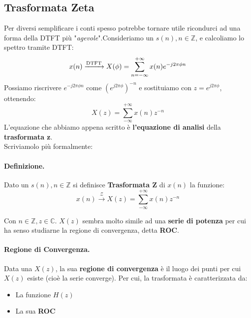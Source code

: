 \newcommand{\zTransform}{\xrightarrow{\mathscr{Z}}}
\newcommand{\zAntitransform}{\xrightarrow{\mathscr{Z}^{-1}}}
\subsection{Trasformata Zeta}
Per diversi semplificare i conti spesso potrebbe tornare utile ricondurci ad una forma della DTFT più "\textit{agevole}".Consideriamo
un $s(n), n\in \mathbb{Z}$, e calcoliamo lo spettro tramite DTFT:
\begin{equation*}
    x(n) \xrightarrow{\text{DTFT}} X(\phi) = \sum_{n = -\infty}^{+\infty} x(n)e^{-j2\pi \phi n}
\end{equation*}
Possiamo riscrivere $e^{-j2\pi \phi n}$ come $(e^{j2\pi \phi})^{-n}$ e sostituiamo con $z = e^{j2\pi \phi}$, ottenendo:
\begin{equation}
    X(z) = \sum_{-\infty}^{+\infty} x(n)z^{-n}
\end{equation}
L'equazione che abbiamo appena scritto è \textbf{l'equazione di analisi} della \textbf{trasformata z}.\\
Scriviamolo più formalmente:\\
\begin{highlightedeq}
\paragraph{Definizione.}Dato un $s(n), n \in \mathbb{Z}$ si definisce \textbf{Trasformata Z} di $x(n)$ la funzione:
\begin{equation}
    x(n) \zTransform X(z) = \sum_{-\infty}^{+\infty} x(n)z^{-n}
\end{equation}
\end{highlightedeq}
Con $n \in \mathbb{Z}, z \in \mathbb{C}$. $X(z)$ sembra molto simile ad una \textbf{serie di potenza} per cui ha senso studiarne la regione di convergenza, detta \textbf{ROC}.
\paragraph{Regione di Convergenza.}Data una $X(z)$, la sua \textbf{regione di convergenza} è il luogo dei punti per cui $X(z)$ esiste (cioè la serie converge).
Per cui, la trasformata è caratterizzata da:
\begin{itemize}
    \item La funzione $H(z)$
    \item La sua \textbf{ROC}
\end{itemize}
